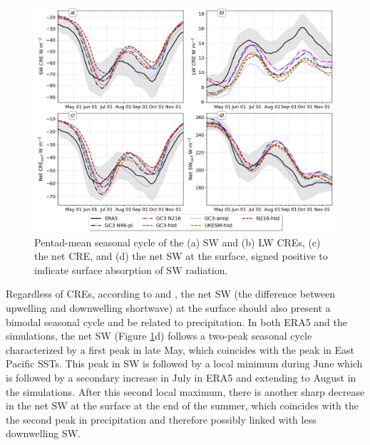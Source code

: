 \begin{figure}[t!]
\includegraphics[width=\linewidth]{figures/cre_index_seasonal.png}
\caption[Seasonal cycle of cloud-radiative effects]{Pentad-mean seasonal cycle of the (a) SW and (b)  LW CREs, (c) the net CRE, and (d) the net SW at the surface, signed positive to indicate surface absorption of SW radiation.}
\label{fig:cre_seasonal}
\end{figure}

 Regardless of CREs, according to \cite{magana1999} and \cite{karnauskas2013}, the net SW (the difference between upwelling and downwelling shortwave) at the surface should also present a bimodal seasonal cycle and be related to precipitation.
In both ERA5 and the simulations, the net SW (Figure \ref{fig:cre_seasonal}d) follows a two-peak seasonal cycle characterized by a first peak in late May, which coincides with the peak in East Pacific SSTs. This peak in SW is followed by a local minimum during June which is followed by a secondary increase in July in ERA5 and extending to August in the simulations. After this second local maximum, there is another sharp decrease in the net SW at the surface at the end of the summer, which coincides with the the second peak in precipitation and therefore possibly linked with less downwelling SW. 

